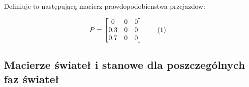 \documentclass[12pt]{book}
\theoremstyle{plain}
\newcommand\addtag{\refstepcounter{equation}
	\renewcommand{\labelenumii}{\theenumii}
	\renewcommand{\theenumii}{\theenumi.\arabic{enumii}.}
	\tag{\theequation}}
\begin{document}
	Definiuje to następującą macierz prawdopodobienstwa przejazdow:
	\def \P {\begin{bmatrix}
			0 & 0 & 0 \\
			0.3 & 0 & 0 \\
			0.7 & 0 & 0 \\
	\end{bmatrix}}
	
	\[
	P=\P \addtag
	\]
	
	
	\subsection{Macierze świateł i stanowe dla poszczególnych faz świateł}
	
	
	\def \Azero {\begin{bmatrix}
			0.7 & 0 & 0 \\
			0.3 & 0 & 0 \\
			0   & 0 & 0 \\
	\end{bmatrix}}
	\def \AI {\begin{bmatrix}
			0.3 & 0 & 0 \\
			0   & 0 & 0 \\
			0.7 & 0 & 0 \\
	\end{bmatrix}}
	\def \Azolte {\begin{bmatrix}
			1 & 0 & 0 \\
			0 & 0 & 0 \\
			0 & 0 & 0 \\
	\end{bmatrix}}
	\def \Szero {\begin{bmatrix}
			0 & 0 & 0 \\
			1 & 0 & 0 \\
			0   & 0 & 0 \\
	\end{bmatrix}}
	\def \SI {\begin{bmatrix}
			0 & 0 & 0 \\
			0   & 0 & 0 \\
			1 & 0 & 0 \\
	\end{bmatrix}}
	\def \Szolte {\begin{bmatrix}
			0 & 0 & 0 \\
			0 & 0 & 0 \\
			0 & 0 & 0 \\
	\end{bmatrix}}
	
\end{document}
